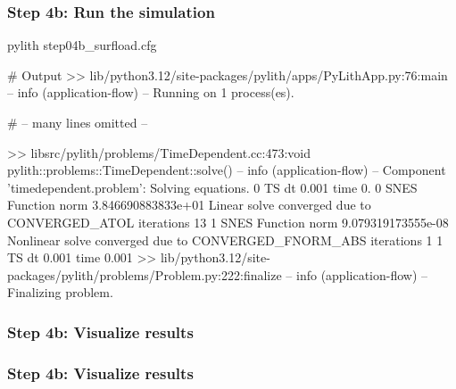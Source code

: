 \documentclass[aspectratio=169]{beamer}
\begin{document}
\begin{frame}[fragile]
  \frametitle{Step 4b: Run the simulation}
  \summary{}

\begin{pyrejournal}
pylith step04b_surfload.cfg

# Output
 >> lib/python3.12/site-packages/pylith/apps/PyLithApp.py:76:main
 -- info (application-flow)
 -- Running on 1 process(es).

# -- many lines omitted --

 >> libsrc/pylith/problems/TimeDependent.cc:473:void pylith::problems::TimeDependent::solve()
 -- info (application-flow)
 -- Component 'timedependent.problem': Solving equations.
0 TS dt 0.001 time 0.
    0 SNES Function norm 3.846690883833e+01
      Linear solve converged due to CONVERGED_ATOL iterations 13
    1 SNES Function norm 9.079319173555e-08
    Nonlinear solve converged due to CONVERGED_FNORM_ABS iterations 1
1 TS dt 0.001 time 0.001
 >> lib/python3.12/site-packages/pylith/problems/Problem.py:222:finalize
 -- info (application-flow)
 -- Finalizing problem.
\end{pyrejournal}
  
\end{frame}


\begin{frame}
  \frametitle{Step 4b: Visualize results}

    
\end{frame}


\begin{frame}
  \frametitle{Step 4b: Visualize results}

    
\end{frame}
\end{document}
